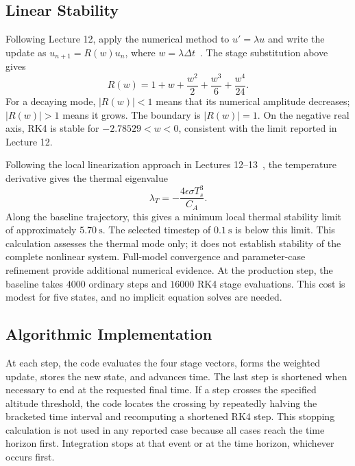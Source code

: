 \documentclass[conf]{new-aiaa}
\begin{document}
\subsection{Linear Stability}


Following Lecture 12, apply the numerical method to $u'=\lambda u$
and write the update as $u_{n+1}=R(w)u_n$, where
$w=\lambda\Delta t$~\cite{lecture12}. The stage substitution above gives
\begin{equation}
R(w)=1+w+\frac{w^2}{2}+\frac{w^3}{6}+\frac{w^4}{24}.
\end{equation}
For a decaying mode, $|R(w)|<1$ means that its numerical amplitude decreases;
$|R(w)|>1$ means it grows. The boundary is $|R(w)|=1$.
On the negative real axis, RK4 is stable for
$-2.78529<w<0$, consistent with the limit reported in Lecture 12.

Following the local linearization approach in Lectures 12--13~\cite{lecture12,lecture13},
the temperature derivative gives the thermal eigenvalue
\begin{equation}
\lambda_T=-\frac{4\epsilon\sigma T_s^3}{C_A}.
\end{equation}
Along the baseline trajectory, this gives a minimum
local thermal stability limit of approximately
$5.70~\mathrm{s}$. The selected timestep of
$0.1~\mathrm{s}$ is below this limit.
This calculation assesses the thermal mode only;
it does not establish stability of the complete
nonlinear system. Full-model convergence and
parameter-case refinement provide additional
numerical evidence. At the production step, the baseline takes $4000$ ordinary
steps and $16000$ RK4 stage evaluations. This cost is modest for five states,
and no implicit equation solves are needed.

\subsection{Algorithmic Implementation}

At each step, the code evaluates the four stage vectors, forms the weighted
update, stores the new state, and advances time. The last step is shortened
when necessary to end at the requested final time. If a step crosses the
specified altitude threshold, the code locates the crossing by repeatedly
halving the bracketed time interval and recomputing a shortened RK4 step.
This stopping calculation is not used in any reported case because all
cases reach the time horizon first. Integration stops at that
event or at the time horizon, whichever occurs first.
\end{document}
